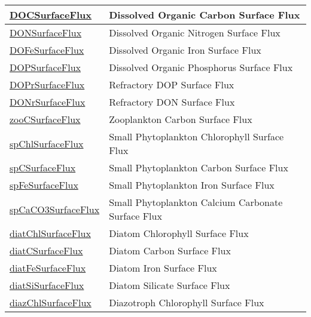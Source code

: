 {\begin{center}
\begin{longtable}{| p{2.0in} | p{4.0in} |}
    \hline
    \hyperref[subsec:var_sec_forcing_DOCSurfaceFlux]{DOCSurfaceFlux} & Dissolved Organic Carbon Surface Flux \\
    \hline
    \hyperref[subsec:var_sec_forcing_DONSurfaceFlux]{DONSurfaceFlux} & Dissolved Organic Nitrogen Surface Flux \\
    \hline
    \hyperref[subsec:var_sec_forcing_DOFeSurfaceFlux]{DOFeSurfaceFlux} & Dissolved Organic Iron Surface Flux \\
    \hline
    \hyperref[subsec:var_sec_forcing_DOPSurfaceFlux]{DOPSurfaceFlux} & Dissolved Organic Phosphorus Surface Flux \\
    \hline
    \hyperref[subsec:var_sec_forcing_DOPrSurfaceFlux]{DOPrSurfaceFlux} & Refractory DOP Surface Flux \\
    \hline
    \hyperref[subsec:var_sec_forcing_DONrSurfaceFlux]{DONrSurfaceFlux} & Refractory DON Surface Flux \\
    \hline
    \hyperref[subsec:var_sec_forcing_zooCSurfaceFlux]{zooCSurfaceFlux} & Zooplankton Carbon Surface Flux \\
    \hline
    \hyperref[subsec:var_sec_forcing_spChlSurfaceFlux]{spChlSurfaceFlux} & Small Phytoplankton Chlorophyll Surface Flux \\
    \hline
    \hyperref[subsec:var_sec_forcing_spCSurfaceFlux]{spCSurfaceFlux} & Small Phytoplankton Carbon Surface Flux \\
    \hline
    \hyperref[subsec:var_sec_forcing_spFeSurfaceFlux]{spFeSurfaceFlux} & Small Phytoplankton Iron Surface Flux \\
    \hline
    \hyperref[subsec:var_sec_forcing_spCaCO3SurfaceFlux]{spCaCO3SurfaceFlux} & Small Phytoplankton Calcium Carbonate Surface Flux \\
    \hline
    \hyperref[subsec:var_sec_forcing_diatChlSurfaceFlux]{diatChlSurfaceFlux} & Diatom Chlorophyll Surface Flux \\
    \hline
    \hyperref[subsec:var_sec_forcing_diatCSurfaceFlux]{diatCSurfaceFlux} & Diatom Carbon Surface Flux \\
    \hline
    \hyperref[subsec:var_sec_forcing_diatFeSurfaceFlux]{diatFeSurfaceFlux} & Diatom Iron Surface Flux \\
    \hline
    \hyperref[subsec:var_sec_forcing_diatSiSurfaceFlux]{diatSiSurfaceFlux} & Diatom Silicate Surface Flux \\
    \hline
    \hyperref[subsec:var_sec_forcing_diazChlSurfaceFlux]{diazChlSurfaceFlux} & Diazotroph Chlorophyll Surface Flux \\

\end{longtable}
\end{center}}
